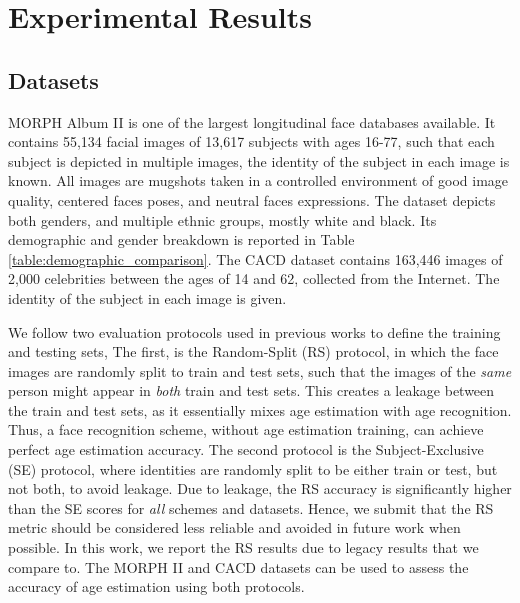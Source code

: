\documentclass[10pt,journal]{IEEEtran}\usepackage{amsfonts}
\begin{document}
\section{Experimental Results}

\label{sec:Experiments}

\subsection{Datasets}

\label{subsec:dataset}

MORPH Album II \cite{1613043} is one of the largest longitudinal face
databases available. It contains 55,134 facial images of 13,617 subjects with
ages 16-77, such that each subject is depicted in multiple images, the
identity of the subject in each image is known. All images are mugshots taken
in a controlled environment of good image quality, centered faces poses, and
neutral faces expressions. The dataset depicts both genders, and multiple
ethnic groups, mostly white and black. Its demographic and gender breakdown is
reported in Table \ref{table:demographic_comparison}. The CACD dataset
\cite{chen14cross} contains 163,446 images of 2,000 celebrities between the
ages of 14 and 62, collected from the Internet. The identity of the subject in
each image is given.

We follow two evaluation protocols used in previous works
\cite{Mean-Variance, 9145576} to define the training and testing
sets, The first, is the Random-Split (RS) protocol, in which the face images
are randomly split to train and test sets, such that the images of the
\textit{same} person might appear in \textit{both} train and test sets. This
creates a leakage between the train and test sets, as it essentially mixes age
estimation with age recognition. Thus, a face recognition scheme, without age
estimation training, can achieve perfect age estimation accuracy. The second
protocol is the Subject-Exclusive (SE) protocol, where identities are randomly
split to be either train or test, but not both, to avoid leakage. Due to
leakage, the RS accuracy is significantly higher than the SE scores for
\textit{all} schemes and datasets. Hence, we submit that the RS metric should
be considered less reliable and avoided in future work when possible. In this
work, we report the RS results due to legacy results that we compare to. The
MORPH II and CACD datasets can be used to assess the accuracy of age
estimation using both protocols.
\end{document}
